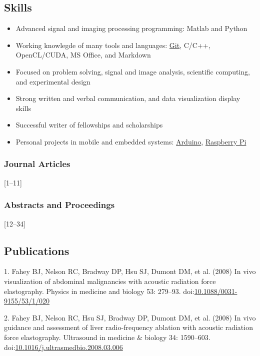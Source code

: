 \documentclass[]{article}
\begin{document}
\subsection{Skills}\label{skills}

\begin{itemize}
\itemsep1pt\parskip0pt
\item
  Advanced signal and imaging processing programming: Matlab and Python
\item
  Working knowlegde of many tools and languages:
  \href{http://git-scm.com/}{Git}, C/C++, OpenCL/CUDA, MS Office, and
  Markdown
\item
  Focused on problem solving, signal and image analysis, scientific
  computing, and experimental design
\item
  Strong written and verbal communication, and data visualization
  display skills
\item
  Successful writer of fellowships and scholarships
\item
  Personal projects in mobile and embedded systems:
  \href{http://www.arduino.cc/}{Arduino},
  \href{http://www.raspberrypi.org/}{Raspberry Pi}
\end{itemize}

\subsubsection{Journal Articles}\label{journal-articles}

{[}1--11{]}

\subsubsection{Abstracts and
Proceedings}\label{abstracts-and-proceedings}

{[}12--34{]}

\subsection{Publications}\label{publications}

1. Fahey BJ, Nelson RC, Bradway DP, Hsu SJ, Dumont DM, et al. (2008) In
vivo visualization of abdominal malignancies with acoustic radiation
force elastography. Physics in medicine and biology 53: 279--93.
doi:\href{http://dx.doi.org/10.1088/0031-9155/53/1/020}{10.1088/0031-9155/53/1/020}

2. Fahey BJ, Nelson RC, Hsu SJ, Bradway DP, Dumont DM, et al. (2008) In
vivo guidance and assessment of liver radio-frequency ablation with
acoustic radiation force elastography. Ultrasound in medicine \& biology
34: 1590--603.
doi:\href{http://dx.doi.org/10.1016/j.ultrasmedbio.2008.03.006}{10.1016/j.ultrasmedbio.2008.03.006}
\end{document}
